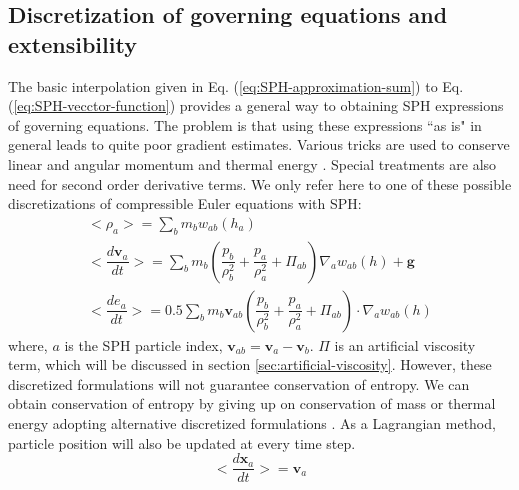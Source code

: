 \documentclass[journal abbreviation, manuscript]{copernicus}
\begin{document}
\subsection{Discretization of governing equations and extensibility}
The basic interpolation given in Eq. (\ref{eq:SPH-approximation-sum}) to Eq. (\ref{eq:SPH-vecctor-function}) provides a general way to obtaining SPH expressions of governing equations. The problem is that using these expressions ``{as is}" in general leads to quite poor gradient estimates. Various tricks are used to conserve linear and angular momentum and thermal energy \citep{monaghan1992smoothed}. Special treatments are also need for second order derivative terms. We only refer here to one of these possible discretizations of compressible Euler equations with SPH:
\begin{align}
<\rho_a> = \sum_b m_b w_{ab} (h_a) \label{eq:ns-sph-d} \\
<\dfrac{d \textbf{v}_a}{d t}>= \sum_b m_b (\dfrac{p_b}{\rho_b^2} + \dfrac{p_a}{\rho_a^2} + \Pi_{ab}) \nabla_a w_{a b}(h) +\textbf{g} \label{eq:ns-sph-v} \\
<\dfrac{d e_a}{d t}>=
 0.5\sum_b m_b \textbf{v}_{a b}(\dfrac{p_b}{\rho_b^2} + \dfrac{p_a}{\rho_a^2} + \Pi_{ab}) \cdot \nabla_a w_{a b}(h) \label{eq:ns-sph-e}
\end{align}
where, $a$ is the SPH particle index, $\textbf{v}_{a b} = \textbf{v}_a - \textbf{v}_b$. $\Pi$ is an artificial viscosity term, which will be discussed in section \ref{sec:artificial-viscosity}.
However, these discretized formulations will not guarantee conservation of entropy. We can obtain conservation of entropy by giving up on conservation of mass or thermal energy adopting  alternative discretized formulations \citep{monaghan1992smoothed}. 
As a Lagrangian method, particle position will also be updated at every time step.
\begin{equation}
<\dfrac{d \textbf{x}_a}{dt}> = \textbf{v}_a \label{eq:SPH-update-pos}
\end{equation}
\end{document}
